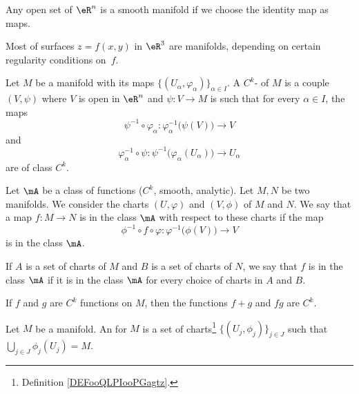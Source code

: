 \begin{example}
	Any open set of $\eR^n$ is a smooth manifold if we choose the identity map as maps.
\end{example}

Most of surfaces $z=f(x,y)$ in $\eR^3$ are manifolds, depending on certain regularity conditions on~$f$.

\begin{definition}       \label{DEFooQLPIooPGagtz}
	Let \( M\) be a manifold with its maps \(  \{ (U_{\alpha}, \varphi_{\alpha}) \}_{\alpha\in I}   \). A \( C^k\)- of \( M\) is a couple \( (V,\psi)\) where \( V\) is open in \( \eR^n\) and \( \psi\colon V\to M\) is such that for every \( \alpha\in I\), the maps
	\begin{equation}
		\psi^{-1}\circ \varphi_{\alpha}\colon \varphi_{\alpha}^{-1}\big( \psi(V) \big)\to V
	\end{equation}
	and
	\begin{equation}
		\varphi_{\alpha}^{-1}\circ \psi\colon \psi^{-1}\big( \varphi_{\alpha}(U_{\alpha}) \big)\to U_{\alpha}
	\end{equation}
	are of class \( C^k\).
\end{definition}

\begin{definition}       \label{DEFooUFHTooTXUVpN}
	Let \( \mA\) be a class of functions (\( C^k\), smooth, analytic). Let \( M,N\) be two manifolds. We consider the charts \( (U,\varphi)\) and \( (V,\phi)\) of \( M\) and \( N\). We say that a map \(f\colon M\to N \) is in the class \( \mA\) with respect to these charts if the map
	\begin{equation}
		\phi^{-1}\circ f\circ\varphi\colon \varphi^{-1}\big( \phi(V) \big)\to V
	\end{equation}
	is in the class \( \mA\).

	If \( A\) is a set of charts of \( M\) and \( B\) is a set of charts of \( N\), we say that \( f\) is in the class \( \mA\) if it is in the class \( \mA\) for every choice of charts in \( A\) and \( B\).
\end{definition}

\begin{proposition}		\label{PROPooCWPAooKDnwHR}
	If \( f\) and \( g\) are \( C^k\) functions on \( M\), then the functions \( f+g\) and \( fg\) are \( C^k\).
\end{proposition}
\noproof


\begin{definition}       \label{DEFooMLNQooEgEfdq}
	Let \( M\) be a manifold. An  for \( M\) is a set of charts\footnote{Definition \ref{DEFooQLPIooPGagtz}.} \( \{  (U_j,\phi_j)  \}_{j\in J}\) such that \( \bigcup_{j\in J}\phi_j(U_j)=M\).
\end{definition}

